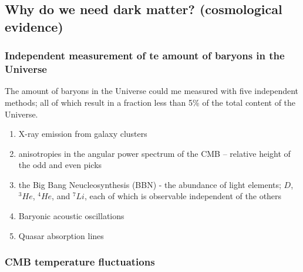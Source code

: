 \documentclass[paper=a4, fontsize=11pt]{scrartcl} %
\numberwithin{equation}{section} %
\numberwithin{figure}{section} %
\numberwithin{table}{section} %
\begin{document}
\subsection{Why do we need dark matter? (cosmological evidence)}

\subsubsection*{Independent measurement of te amount of baryons in the Universe}
The amount of baryons in the Universe could me measured with five independent methods; all of which result in a fraction less than 5\% of the total content of the Universe.
  \begin{enumerate}
  \item X-ray emission from galaxy clusters
  \item anisotropies in the angular power spectrum of the CMB -- relative height of the odd and even picks
  \item the Big Bang Neucleosynthesis (BBN) - the abundance of light elements; $D$, $^3He$, $^4He$, and $^7Li$, each of which is observable independent of the others \citep[for Planck data see ][]{Planck2014}
  \item Baryonic acoustic oscillations
  \item Quasar absorption lines
  \end{enumerate}


\subsubsection{CMB temperature fluctuations}
\end{document}
